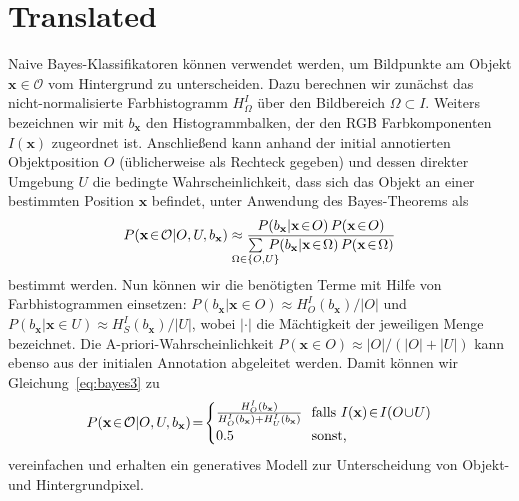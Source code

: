 \documentclass[a4paper,10pt]{article}
\renewcommand{\vec}[1]{\ensuremath{\mathbf{#1}}}
\begin{document}
\section*{Translated}
Naive Bayes-Klassifikatoren können verwendet werden, um Bildpunkte am Objekt $\vec{x}\in\mathcal{O}$ vom Hintergrund zu unterscheiden.
Dazu berechnen wir zunächst das nicht-normalisierte Farbhistogramm $H^I_\Omega$ \"uber den Bildbereich $\Omega\subset I$.
Weiters bezeichnen wir mit $b_\vec{x}$ den Histogrammbalken, der den RGB Farbkomponenten $I(\vec{x})$ zugeordnet ist.
Anschließend kann anhand der initial annotierten Objektposition $O$ (\"ublicherweise als Rechteck gegeben) und dessen direkter Umgebung $U$ die bedingte Wahrscheinlichkeit, dass sich das Objekt an einer bestimmten Position $\vec{x}$ befindet, unter Anwendung des Bayes-Theorems als
\begin{align}
  P\!\left(\vec{x}\!\in\!\mathcal{O}|O,U,b_\vec{x}\right) \approx \frac{P\!\left( b_\vec{x}|\vec{x}\!\in\!O\right)  P\!\left(\vec{x}\!\in\!O\right)}{\sum\limits_{\mathclap{\Omega\in\{O,U\}}}{\:P\!\left(b_\vec{x}|\vec{x}\!\in\!\Omega\right) P\!\left(\vec{x}\!\in\!\Omega\right)}}\label{eq:bayes3}
\end{align}
bestimmt werden.
Nun können wir die ben\"otigten Terme mit Hilfe von Farbhistogrammen einsetzen: $P\!\left( b_\vec{x}|\vec{x}\!\in\!O\right) \approx H^I_O(b_\vec{x})/|O|$ und $P\!\left( b_\vec{x}|\vec{x}\!\in\!U\right) \approx H^I_S(b_\vec{x})/|U|$, wobei $|\cdot|$ die M\"achtigkeit der jeweiligen Menge bezeichnet.
Die A-priori-Wahrscheinlichkeit $P\!\left(\vec{x}\!\in\!O\right)\approx|O|/(|O|+|U|)$ kann ebenso aus der initialen Annotation abgeleitet werden.
Damit k\"onnen wir Gleichung~\eqref{eq:bayes3} zu
\begin{gather}
\begin{aligned}
  P\!\left(\vec{x}\!\in\!\mathcal{O}|O,U,b_\vec{x}\right)\!=\!\begin{cases}
                                                                            \frac{H^I_{O}(b_\vec{x})}{H^I_{O}(b_\vec{x}) + H^I_{U}(b_\vec{x})} & \!\!\text{falls $I(\vec{x})\!\in\!I(O\!\cup\!U)$}\\
                                                                            0.5 & \!\!\text{sonst,}
                                                                          \end{cases}\label{eq:om_surr3}
\end{aligned}\raisetag{\baselineskip}
\end{gather}
vereinfachen und erhalten ein generatives Modell zur Unterscheidung von Objekt- und Hintergrundpixel.
\end{document}
